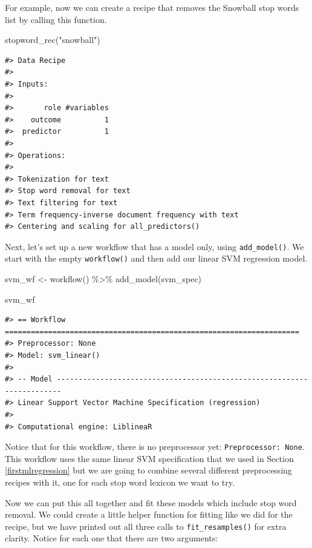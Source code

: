 \documentclass[
]{krantz}
\makeatletter
\newenvironment{Shaded}{\begin{snugshade}}{\end{snugshade}}
\newcommand{\FunctionTok}[1]{\textcolor[rgb]{0.00,0.00,0.00}{#1}}
\newcommand{\NormalTok}[1]{#1}
\newcommand{\OtherTok}[1]{\textcolor[rgb]{0.56,0.35,0.01}{#1}}
\newcommand{\SpecialCharTok}[1]{\textcolor[rgb]{0.00,0.00,0.00}{#1}}
\newcommand{\StringTok}[1]{\textcolor[rgb]{0.31,0.60,0.02}{#1}}
\newenvironment{kframe}{%
\medskip{}
\setlength{\fboxsep}{.8em}
 \def\at@end@of@kframe{}%
 \ifinner\ifhmode%
  \def\at@end@of@kframe{\end{minipage}}%
  \begin{minipage}{\columnwidth}%
 \fi\fi%
 \def\FrameCommand##1{\hskip\@totalleftmargin \hskip-\fboxsep
 \colorbox{shadecolor}{##1}\hskip-\fboxsep
     \hskip-\linewidth \hskip-\@totalleftmargin \hskip\columnwidth}%
 \MakeFramed {\advance\hsize-\width
   \@totalleftmargin\z@ \linewidth\hsize
   \@setminipage}}%
 {\par\unskip\endMakeFramed%
 \at@end@of@kframe}
\renewenvironment{Shaded}{\begin{kframe}}{\end{kframe}}
\makeatother
\begin{document}
For example, now we can create a recipe that removes the Snowball stop words list by calling this function.

\begin{Shaded}
\begin{Highlighting}[]
\FunctionTok{stopword\_rec}\NormalTok{(}\StringTok{"snowball"}\NormalTok{)}
\end{Highlighting}
\end{Shaded}

\begin{verbatim}
#> Data Recipe
#> 
#> Inputs:
#> 
#>       role #variables
#>    outcome          1
#>  predictor          1
#> 
#> Operations:
#> 
#> Tokenization for text
#> Stop word removal for text
#> Text filtering for text
#> Term frequency-inverse document frequency with text
#> Centering and scaling for all_predictors()
\end{verbatim}

Next, let's set up a new workflow that has a model only, using \texttt{add\_model()}. We start with the empty \texttt{workflow()} and then add our linear SVM regression model.

\begin{Shaded}
\begin{Highlighting}[]
\NormalTok{svm\_wf }\OtherTok{\textless{}{-}} \FunctionTok{workflow}\NormalTok{() }\SpecialCharTok{\%\textgreater{}\%}
  \FunctionTok{add\_model}\NormalTok{(svm\_spec)}

\NormalTok{svm\_wf}
\end{Highlighting}
\end{Shaded}

\begin{verbatim}
#> == Workflow ====================================================================
#> Preprocessor: None
#> Model: svm_linear()
#> 
#> -- Model -----------------------------------------------------------------------
#> Linear Support Vector Machine Specification (regression)
#> 
#> Computational engine: LiblineaR
\end{verbatim}

Notice that for this workflow, there is no preprocessor yet: \texttt{Preprocessor:\ None}. This workflow uses the same linear SVM specification that we used in Section \ref{firstmlregression} but we are going to combine several different preprocessing recipes with it, one for each stop word lexicon we want to try.

Now we can put this all together and fit these models which include stop word removal. We could create a little helper function for fitting like we did for the recipe, but we have printed out all three calls to \texttt{fit\_resamples()} for extra clarity. Notice for each one that there are two arguments:
\end{document}
